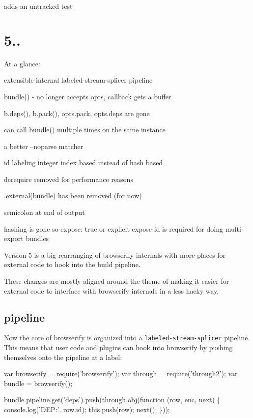 adds an untracked test

\section*{5..}

At a glance\+:


\begin{DoxyItemize}
\item extensible internal labeled-\/stream-\/splicer pipeline
\item bundle() -\/ no longer accepts {\ttfamily opts}, callback gets a buffer
\item b.\+deps(), b.\+pack(), opts.\+pack, opts.\+deps are gone
\item can call bundle() multiple times on the same instance
\item a better --noparse matcher
\item id labeling integer index based instead of hash based
\item derequire removed for performance reasons
\item .external(bundle) has been removed (for now)
\item semicolon at end of output
\item hashing is gone so {\ttfamily expose\+: true} or explicit expose id is required for doing multi-\/export bundles
\end{DoxyItemize}

Version 5 is a big rearranging of browserify internals with more places for external code to hook into the build pipeline.

These changes are mostly aligned around the theme of making it easier for external code to interface with browserify internals in a less hacky way.

\subsection*{pipeline}

Now the core of browserify is organized into a \href{https://npmjs.org/package/labeled-stream-splicer}{\tt labeled-\/stream-\/splicer} pipeline. This means that user code and plugins can hook into browserify by pushing themselves onto the pipeline at a label\+:


\begin{DoxyCode}
var browserify = require('browserify');
var through = require('through2');
var bundle = browserify();

bundle.pipeline.get('deps').push(through.obj(function (row, enc, next) \{
    console.log('DEP:', row.id);
    this.push(row);
    next();
\}));
\end{DoxyCode}



